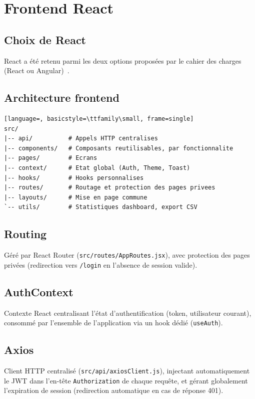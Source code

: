 \chapter{Frontend React}
\label{ch:frontend}

\section{Choix de React}

React a \'et\'e retenu parmi les deux options propos\'ees par le cahier des charges (React ou Angular)~\cite{react}.

\section{Architecture frontend}

\begin{lstlisting}[language=, basicstyle=\ttfamily\small, frame=single]
src/
|-- api/          # Appels HTTP centralises
|-- components/   # Composants reutilisables, par fonctionnalite
|-- pages/        # Ecrans
|-- context/      # Etat global (Auth, Theme, Toast)
|-- hooks/        # Hooks personnalises
|-- routes/       # Routage et protection des pages privees
|-- layouts/      # Mise en page commune
`-- utils/        # Statistiques dashboard, export CSV
\end{lstlisting}

\section{Routing}

G\'er\'e par React Router (\texttt{src/routes/AppRoutes.jsx}), avec protection des pages priv\'ees (redirection vers \texttt{/login} en l'absence de session valide).

\section{AuthContext}

Contexte React centralisant l'\'etat d'authentification (token, utilisateur courant), consomm\'e par l'ensemble de l'application via un hook d\'edi\'e (\texttt{useAuth}).

\section{Axios}

Client HTTP centralis\'e (\texttt{src/api/axiosClient.js}), injectant automatiquement le JWT dans l'en-t\^ete \texttt{Authorization} de chaque requ\^ete, et g\'erant globalement l'expiration de session (redirection automatique en cas de r\'eponse 401).

